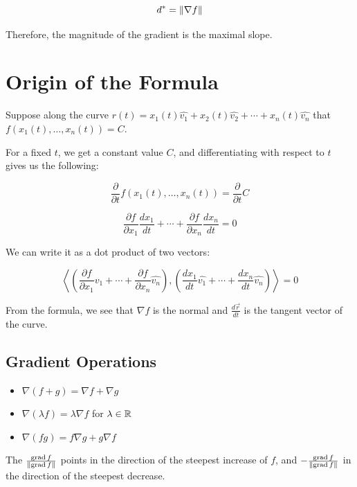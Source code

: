 \[
    d^* = \left\| \nabla f \right\|
\]

Therefore, the magnitude of the gradient is the maximal slope. 

\section{Origin of the Formula}

Suppose along the curve \(r(t) = x_1(t)\hat{v_1} + x_2(t)\hat{v_2} + \cdots + x_n(t)\hat{v_n}\) that 
\(f(x_1(t), \dots, x_n(t)) = C\).

For a fixed \(t\), we get a constant value \(C\), and differentiating with respect to \(t\) gives us the following:

\[
    \frac{\partial}{\partial t}f(x_1(t), \dots, x_n(t)) = \frac{\partial}{\partial t}C
\]

\[
    \frac{\partial f}{\partial x_1}\frac{dx_1}{dt} + \cdots + \frac{\partial f}{\partial x_n}
    \frac{dx_n}{dt} = 0
\]

We can write it as a dot product of two vectors:

\[
    \left\langle \left(\frac{\partial f}{\partial x_1}\hat{v_1} + \cdots + \frac{\partial f}{\partial x_n}
    \hat{v_n}\right) , \left( \frac{dx_1}{dt}\hat{v_1} + \cdots + \frac{dx_n}{dt}\hat{v_n}\right)\right\rangle = 0
\]

From the formula, we see that \(\nabla f\) is the normal and \(\frac{d\vec{r}}{dt}\) is the tangent vector 
of the curve.

\QED

\subsection{Gradient Operations}

\begin{itemize}

    \item \( \nabla(f + g) = \nabla f + \nabla g \)

    \item \( \nabla(\lambda f) = \lambda \nabla f \) for \( \lambda \in \mathbb{R} \)

    \item \( \nabla(fg) = f \nabla g + g \nabla f \)

\end{itemize}

The \(\frac{\operatorname{grad}f}{\left\| \operatorname{grad}f \right\|}\) points in the direction of the 
steepest increase of \(f\), and \(- \frac{\operatorname{grad}f}{\left\| \operatorname{grad}f \right\|}\) in 
the direction of the steepest decrease.

